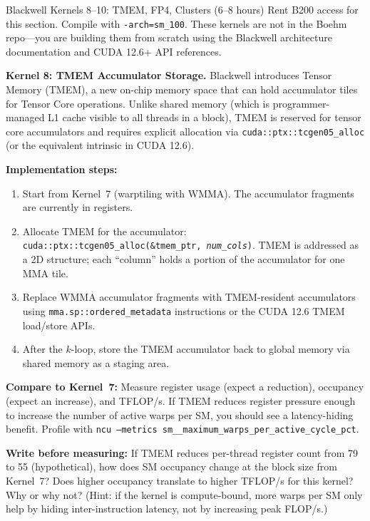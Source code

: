 \begin{exercise}{Blackwell Kernels 8--10: TMEM, FP4, Clusters (6--8 hours)}
Rent B200 access for this section. Compile with \texttt{-arch=sm\_100}. These kernels are not in the Boehm repo---you are building them from scratch using the Blackwell architecture documentation and CUDA 12.6+ API references.

\medskip
\textbf{Kernel 8: TMEM Accumulator Storage.}
Blackwell introduces Tensor Memory (TMEM), a new on-chip memory space that can hold accumulator tiles for Tensor Core operations. Unlike shared memory (which is programmer-managed L1 cache visible to all threads in a block), TMEM is reserved for tensor core accumulators and requires explicit allocation via \texttt{cuda::ptx::tcgen05\_alloc} (or the equivalent intrinsic in CUDA 12.6).

\textbf{Implementation steps:}
\begin{enumerate}
  \item Start from Kernel~7 (warptiling with WMMA). The accumulator fragments are currently in registers.
  \item Allocate TMEM for the accumulator: \texttt{cuda::ptx::tcgen05\_alloc(\&tmem\_ptr, \textit{num\_cols})}. TMEM is addressed as a 2D structure; each ``column'' holds a portion of the accumulator for one MMA tile.
  \item Replace WMMA accumulator fragments with TMEM-resident accumulators using \texttt{mma.sp::ordered\_metadata} instructions or the CUDA 12.6 TMEM load/store APIs.
  \item After the $k$-loop, store the TMEM accumulator back to global memory via shared memory as a staging area.
\end{enumerate}

\textbf{Compare to Kernel~7:} Measure register usage (expect a reduction), occupancy (expect an increase), and TFLOP/s. If TMEM reduces register pressure enough to increase the number of active warps per SM, you should see a latency-hiding benefit. Profile with \texttt{ncu --metrics sm\_\_maximum\_warps\_per\_active\_cycle\_pct}.

\textbf{Write before measuring:} If TMEM reduces per-thread register count from 79 to 55 (hypothetical), how does SM occupancy change at the block size from Kernel~7? Does higher occupancy translate to higher TFLOP/s for this kernel? Why or why not? (Hint: if the kernel is compute-bound, more warps per SM only help by hiding inter-instruction latency, not by increasing peak FLOP/s.)


\end{exercise}
